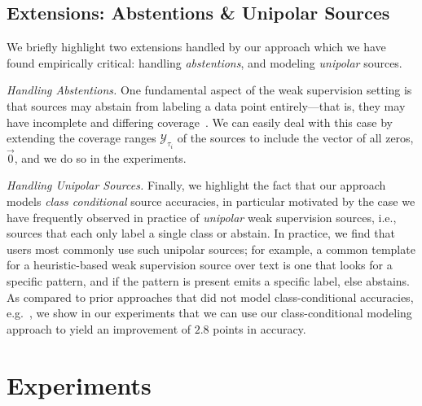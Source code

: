 \documentclass[letterpaper]{article}
\newcommand{\AvgUnipolarBoost}[0]{2.8}
\begin{document}
\subsection{Extensions: Abstentions \& Unipolar Sources}
\label{sec:extensions}
We briefly highlight two extensions handled by our approach which we have found empirically critical: handling \textit{abstentions}, and modeling \textit{unipolar} sources.

\textit{Handling Abstentions. }
One fundamental aspect of the weak supervision setting is that sources may abstain from labeling a data point entirely---that is, they may have incomplete and differing coverage~\cite{ratner2018snorkel,Dalvi:2013:ACB:2488388.2488414}.
We can easily deal with this case by extending the coverage ranges $\mathcal{Y}_{\tau_i}$ of the sources to include the vector of all zeros, $\vec{0}$, and we do so in the experiments.

\textit{Handling Unipolar Sources. }
Finally, we highlight the fact that our approach models \textit{class conditional} source accuracies, in particular motivated by the case we have frequently observed in practice of \textit{unipolar} weak supervision sources, i.e., sources that each only label a single class or abstain.
In practice, we find that users most commonly use such unipolar sources; for example, a common template for a heuristic-based weak supervision source over text is one that looks for a specific pattern, and if the pattern is present emits a specific label, else abstains. 
As compared to prior approaches that did not model class-conditional accuracies, e.g.~\cite{ratner2016data}, we show in our experiments that we can use our class-conditional modeling approach to yield an improvement of $\AvgUnipolarBoost$ points in accuracy.
 
\section{Experiments}
\label{sec:experiments}
\end{document}
